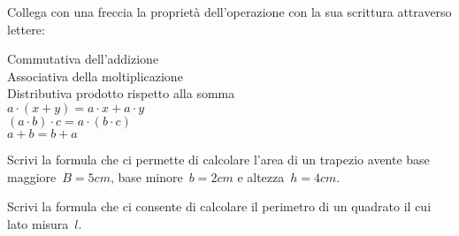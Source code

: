 
\begin{esercizio}
\label{ese:9.4} %
 Collega con una freccia la proprietà dell'operazione con la sua scrittura attraverso lettere:
 \begin{multicols}{2}
 \noindent
 Commutativa dell'addizione\\
 Associativa della moltiplicazione\\
 Distributiva prodotto rispetto alla somma\\
 $a\cdot (x+y)=a\cdot x+a\cdot y$\\
 $\left(a\cdot b\right)\cdot c=a\cdot \left(b\cdot c\right)$\\
 ${a+b=b+a}$
 \end{multicols}
\end{esercizio}

%

\begin{esercizio}
\label{ese:9.5} %
Scrivi la formula che ci permette di calcolare l'area di un trapezio avente base maggiore~$B=5\unit{cm}$, base minore~$b=2\unit{cm}$ e altezza~$h=4\unit{cm}$.
\end{esercizio}

\begin{esercizio}
\label{ese:9.6} %
Scrivi la formula che ci consente di calcolare il perimetro di un quadrato il cui lato misura~$l$.
\end{esercizio}

